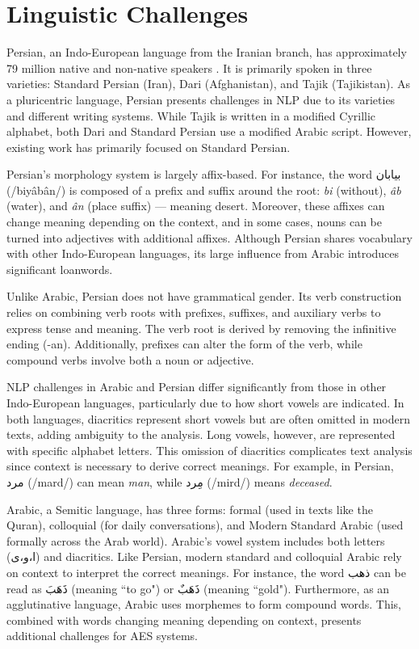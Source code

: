 \documentclass{article}
\begin{document}
\section{Linguistic Challenges}
Persian, an Indo-European language from the Iranian branch, has approximately 79 million native and non-native speakers \cite{wikitotalspeakers}. It is primarily spoken in three varieties: Standard Persian (Iran), Dari (Afghanistan), and Tajik (Tajikistan). As a pluricentric language, Persian presents challenges in NLP due to its varieties and different writing systems. While Tajik is written in a modified Cyrillic alphabet, both Dari and Standard Persian use a modified Arabic script. However, existing work has primarily focused on Standard Persian.

Persian's morphology system is largely affix-based. For instance, the word \textfarsi{بیابان} (/biyâbân/) is composed of a prefix and suffix around the root: \textit{bi} (without), \textit{âb} (water), and \textit{ân} (place suffix) — meaning desert. Moreover, these affixes can change meaning depending on the context, and in some cases, nouns can be turned into adjectives with additional affixes. Although Persian shares vocabulary with other Indo-European languages, its large influence from Arabic introduces significant loanwords.

Unlike Arabic, Persian does not have grammatical gender. Its verb construction relies on combining verb roots with prefixes, suffixes, and auxiliary verbs to express tense and meaning. The verb root is derived by removing the infinitive ending (-an). Additionally, prefixes can alter the form of the verb, while compound verbs involve both a noun or adjective.

NLP challenges in Arabic and Persian differ significantly from those in other Indo-European languages, particularly due to how short vowels are indicated. In both languages, diacritics represent short vowels but are often omitted in modern texts, adding ambiguity to the analysis. Long vowels, however, are represented with specific alphabet letters. This omission of diacritics complicates text analysis since context is necessary to derive correct meanings. For example, in Persian, \textfarsi{مرد} (/mard/) can mean \textit{man}, while \textfarsi{مِرد} (/mird/) means \textit{deceased}.

Arabic, a Semitic language, has three forms: formal (used in texts like the Quran), colloquial (for daily conversations), and Modern Standard Arabic (used formally across the Arab world). Arabic’s vowel system includes both letters (\textarabic{ا،و،ى}) and diacritics. Like Persian, modern standard and colloquial Arabic rely on context to interpret the correct meanings. For instance, the word \textarabic{ذهب} can be read as \textarabic{ذَهَبَ} (meaning ``to go") or \textarabic{ذَهَبٌ} (meaning ``gold"). Furthermore, as an agglutinative language, Arabic uses morphemes to form compound words. This, combined with words changing meaning depending on context, presents additional challenges for AES systems.
\end{document}
